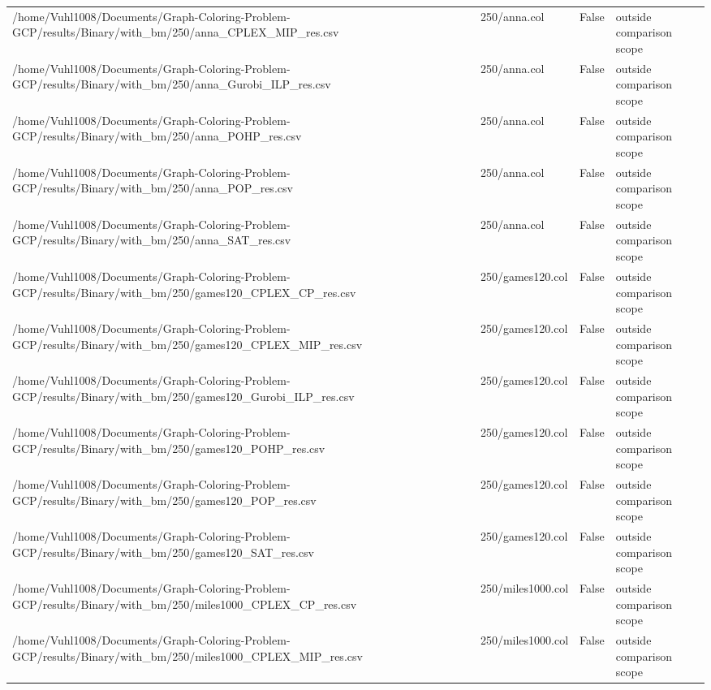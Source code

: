 \begin{table}[htbp]
\begin{tabular}{llll}
/home/Vuhl1008/Documents/Graph-Coloring-Problem-GCP/results/Binary/with\_bm/250/anna\_CPLEX\_MIP\_res.csv & 250/anna.col & False & outside comparison scope \\
/home/Vuhl1008/Documents/Graph-Coloring-Problem-GCP/results/Binary/with\_bm/250/anna\_Gurobi\_ILP\_res.csv & 250/anna.col & False & outside comparison scope \\
/home/Vuhl1008/Documents/Graph-Coloring-Problem-GCP/results/Binary/with\_bm/250/anna\_POHP\_res.csv & 250/anna.col & False & outside comparison scope \\
/home/Vuhl1008/Documents/Graph-Coloring-Problem-GCP/results/Binary/with\_bm/250/anna\_POP\_res.csv & 250/anna.col & False & outside comparison scope \\
/home/Vuhl1008/Documents/Graph-Coloring-Problem-GCP/results/Binary/with\_bm/250/anna\_SAT\_res.csv & 250/anna.col & False & outside comparison scope \\
/home/Vuhl1008/Documents/Graph-Coloring-Problem-GCP/results/Binary/with\_bm/250/games120\_CPLEX\_CP\_res.csv & 250/games120.col & False & outside comparison scope \\
/home/Vuhl1008/Documents/Graph-Coloring-Problem-GCP/results/Binary/with\_bm/250/games120\_CPLEX\_MIP\_res.csv & 250/games120.col & False & outside comparison scope \\
/home/Vuhl1008/Documents/Graph-Coloring-Problem-GCP/results/Binary/with\_bm/250/games120\_Gurobi\_ILP\_res.csv & 250/games120.col & False & outside comparison scope \\
/home/Vuhl1008/Documents/Graph-Coloring-Problem-GCP/results/Binary/with\_bm/250/games120\_POHP\_res.csv & 250/games120.col & False & outside comparison scope \\
/home/Vuhl1008/Documents/Graph-Coloring-Problem-GCP/results/Binary/with\_bm/250/games120\_POP\_res.csv & 250/games120.col & False & outside comparison scope \\
/home/Vuhl1008/Documents/Graph-Coloring-Problem-GCP/results/Binary/with\_bm/250/games120\_SAT\_res.csv & 250/games120.col & False & outside comparison scope \\
/home/Vuhl1008/Documents/Graph-Coloring-Problem-GCP/results/Binary/with\_bm/250/miles1000\_CPLEX\_CP\_res.csv & 250/miles1000.col & False & outside comparison scope \\
/home/Vuhl1008/Documents/Graph-Coloring-Problem-GCP/results/Binary/with\_bm/250/miles1000\_CPLEX\_MIP\_res.csv & 250/miles1000.col & False & outside comparison scope \\

\end{tabular}
\end{table}
